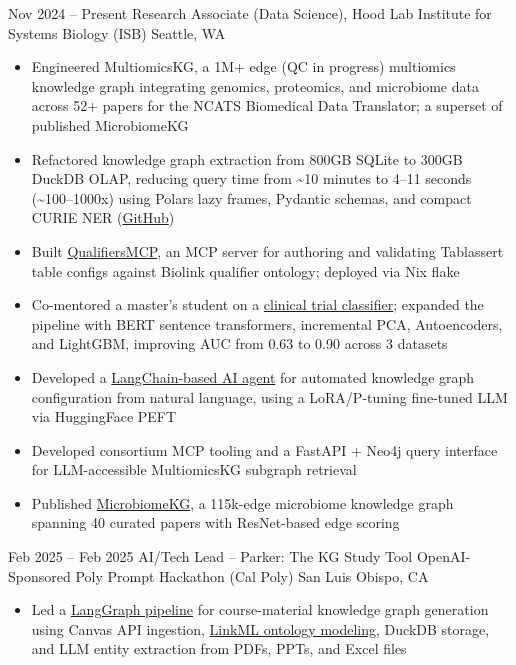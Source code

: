 \documentclass[11pt]{moderncv}
\newcommand{\skyespace}{\vspace{8pt}}
\newcommand{\colorhref}[2]{\href{#1}{\textcolor{linkblue}{#2}}}
\begin{document}
\skyespace
\cventry
{Nov 2024 -- Present}
{Research Associate (Data Science), Hood Lab}
{Institute for Systems Biology (ISB)}
{Seattle, WA}
{}
{%
	\begin{itemize}
		\item Engineered MultiomicsKG, a 1M+ edge (QC in progress) multiomics knowledge graph integrating genomics, proteomics, and microbiome data across 52+ papers for the NCATS Biomedical Data Translator; a superset of published MicrobiomeKG 
		\item Refactored knowledge graph extraction from 800GB SQLite to 300GB DuckDB OLAP, reducing query time from \textasciitilde 10 minutes to 4--11 seconds (\textasciitilde 100--1000x) using Polars lazy frames, Pydantic schemas, and compact CURIE NER (\colorhref{https://skyeav.github.io/Tablassert/}{GitHub})
		\item Built \colorhref{https://github.com/SkyeAv/QualifiersMCP}{QualifiersMCP}, an MCP server for authoring and validating Tablassert table configs against Biolink qualifier ontology; deployed via Nix flake
		\item Co-mentored a master's student on a \colorhref{https://github.com/SkyeAv/CTClassifier}{clinical trial classifier}; expanded the pipeline with BERT sentence transformers, incremental PCA, Autoencoders, and LightGBM, improving AUC from 0.63 to 0.90 across 3 datasets
		\item Developed a \colorhref{https://github.com/SkyeAv/TableConfigAgent}{LangChain-based AI agent} for automated knowledge graph configuration from natural language, using a LoRA/P-tuning fine-tuned LLM via HuggingFace PEFT
		\item Developed consortium MCP tooling and a FastAPI + Neo4j query interface for LLM-accessible MultiomicsKG subgraph retrieval
		\item Published \colorhref{https://www.frontiersin.org/journals/systems-biology/articles/10.3389/fsysb.2025.1544432/full}{MicrobiomeKG}, a 115k-edge microbiome knowledge graph spanning 40 curated papers with ResNet-based edge scoring
	\end{itemize}
}

\skyespace
\cventry
{Feb 2025 -- Feb 2025}
{AI/Tech Lead -- Parker: The KG Study Tool}
{OpenAI-Sponsored Poly Prompt Hackathon (Cal Poly)}
{San Luis Obispo, CA}
{}
{%
	\begin{itemize}
		\item Led a \colorhref{https://github.com/POLY-PROMPT-TEAM-7/backend}{LangGraph pipeline} for course-material knowledge graph generation using Canvas API ingestion, \colorhref{https://github.com/POLY-PROMPT-TEAM-7/StudyOntology}{LinkML ontology modeling}, DuckDB storage, and LLM entity extraction from PDFs, PPTs, and Excel files
	\end{itemize}
}
\end{document}
